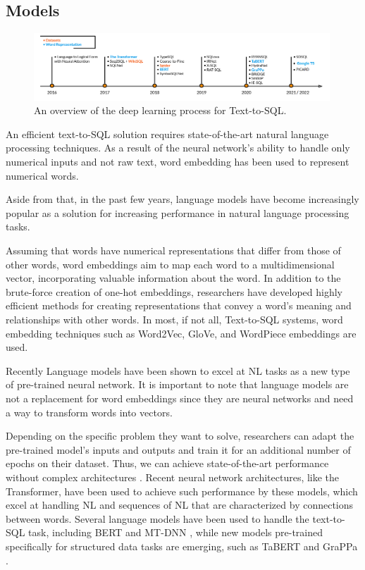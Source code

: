 \subsection*{Models}

\begin{figure}[htb]
    \centering
    \includegraphics[width=0.99\textwidth]{pics/Timeline.png}
    \caption{An overview of the deep learning process for Text-to-SQL.}
    \label{fig:timeline}
\end{figure}

An efficient text-to-SQL solution requires state-of-the-art natural language processing techniques.
As a result of the neural network's ability to handle only numerical inputs and not raw text, word embedding has been used to represent numerical words.

Aside from that, in the past few years, language models have become increasingly popular as a solution for increasing performance in natural language processing tasks.

Assuming that words have numerical representations that differ from those of other words, word embeddings aim to map each word to a multidimensional vector, incorporating valuable information about the word. In addition to the brute-force creation of one-hot embeddings, researchers have developed highly efficient methods for creating representations that convey a word's meaning and relationships with other words. In most, if not all, Text-to-SQL systems, word embedding techniques such as Word2Vec\cite{DBLP:journals/corr/Rong14}, GloVe, and WordPiece embeddings\cite{DBLP:journals/corr/WuSCLNMKCGMKSJL16} are used.

Recently Language models have been shown to excel at NL tasks as a new type of pre-trained neural network. It is important to note that language models are not a replacement for word embeddings since they are neural networks and need a way to transform words into vectors.

Depending on the specific problem they want to solve, researchers can adapt the pre-trained model's inputs and outputs and train it for an additional number of epochs on their dataset. Thus, we can achieve state-of-the-art performance without complex architectures \cite{DBLP:journals/corr/abs-1810-04805}. Recent neural network architectures, like the Transformer\cite{DBLP:journals/corr/VaswaniSPUJGKP17}, have been used to achieve such performance by these models, which excel at handling NL and sequences of NL that are characterized by connections between words. Several language models have been used to handle the text-to-SQL task, including BERT \cite{DBLP:journals/corr/abs-1810-04805} and MT-DNN \cite{DBLP:journals/corr/abs-1901-11504}, while new models pre-trained specifically for structured data tasks are emerging, such as TaBERT\cite{DBLP:journals/corr/abs-2005-08314} and GraPPa \cite{DBLP:journals/corr/abs-2009-13845}.


